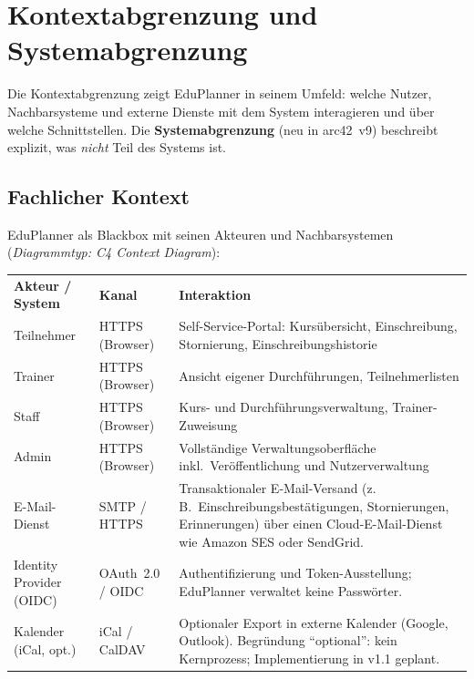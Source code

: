 \section{Kontextabgrenzung und Systemabgrenzung}

Die Kontextabgrenzung zeigt EduPlanner in seinem Umfeld: welche Nutzer, Nachbarsysteme und externe Dienste mit dem System interagieren und über welche Schnittstellen. Die \textbf{Systemabgrenzung} (neu in arc42~v9) beschreibt explizit, was \emph{nicht} Teil des Systems ist.

\subsection{Fachlicher Kontext}

EduPlanner als Blackbox mit seinen Akteuren und Nachbarsystemen (\emph{Diagrammtyp: C4 Context Diagram}):

\begin{tabularx}{\textwidth}{L{3.2cm} L{2.8cm} X}
  \color{white}\textbf{Akteur / System} &
  \color{white}\textbf{Kanal} &
  \color{white}\textbf{Interaktion} \\

  Teilnehmer &
  HTTPS (Browser) &
  Self-Service-Portal: Kursübersicht, Einschreibung,
  Stornierung, Einschreibungshistorie \\

  Trainer &
  HTTPS (Browser) &
  Ansicht eigener Durchführungen, Teilnehmerlisten \\

  Staff &
  HTTPS (Browser) &
  Kurs- und Durchführungsverwaltung,
  Trainer-Zuweisung \\

  Admin &
  HTTPS (Browser) &
  Vollständige Verwaltungsoberfläche inkl.\
  Veröffentlichung und Nutzerverwaltung \\

  E-Mail-Dienst\footnotemark{} &
  SMTP / HTTPS &
  Transaktionaler E-Mail-Versand
  (z.\,B.\ Einschreibungsbestätigungen,
  Stornierungen, Erinnerungen) über einen
  Cloud-E-Mail-Dienst wie Amazon SES
  oder SendGrid. \\

  Identity Provider (OIDC) &
  OAuth~2.0 / OIDC &
  Authentifizierung und Token-Ausstellung;
  EduPlanner verwaltet keine Passwörter. \\

  Kalender (iCal, opt.) &
  iCal / CalDAV &
  Optionaler Export in externe Kalender
  (Google, Outlook). Begründung ``optional'':
  kein Kernprozess; Implementierung in
  v1.1 geplant. \\
\end{tabularx}

